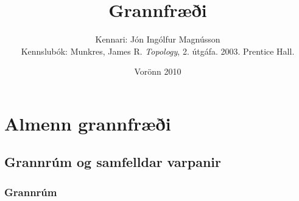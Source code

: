 \documentclass[a4paper,icelandic]{book}
\title{\textbf{Grannfræði}}
\author{%
Kennari: Jón Ingólfur Magnússon\\
Kennslubók: Munkres, James R. \emph{Topology}, 2. útgáfa. 2003. Prentice Hall.
}
\date{Vorönn 2010}
\theoremstyle{definition}
\theoremstyle{plain}
\theoremstyle{remark}
\begin{document}
\maketitle
\tableofcontents

\part{Almenn grannfræði}

\chapter{Grannrúm og samfelldar varpanir}

\section{Grannrúm}
\end{document}
